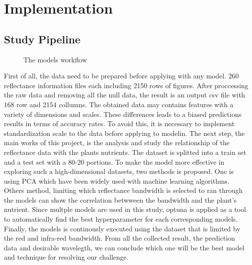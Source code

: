 \section{Implementation} \label{implementation}

\subsection{Study Pipeline}

\begin{figure}[h]
\centering
\caption{The models workflow} \label{fig:models-workflow}
\end{figure}

First of all, the data need to be prepared before applying with any model. 260 reflectance information files each including 2150 rows of figures. After proccessing the raw data and removing all the null data, the result is an output csv file with 168 row and 2154 collumns. The obtained data may contains features with a variety of dimensions and scales. These differences leads to a biased predictions results in terms of accuracy rates. To avoid this, it is necessary to implement standardization scale to the data before applying to modelin. The next step, the main works of this project, is the analysis and study the relationship of the reflectance data with the plants nutrients. The dataset is splitted into a train set and a test set with a 80-20 portions. To make the model more effective in exploring such a high-dimensional datasets, two methods is proposed. One is using PCA which have been widely used with machine learning algorithms. Others method, limiting which reflectance bandwidth is selected to ran through the models can show the correlation betwween the bandwidth and the plant's nutrient. Since multple models are used in this study, optuna is applied as a tool to automatically find the best hyperparameter for each corresponding models. Finally, the models is continously executed using the dataset that is limited by the red and infra-red bandwidth. From all the collected result, the prediction data and desirable wavelegth, we can conclude which one will be the best model and technique for resolving our challenge.  
 

